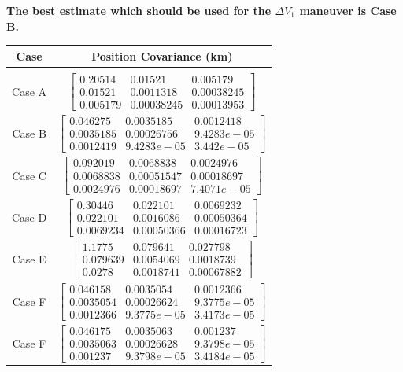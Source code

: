 \documentclass[conf]{new-aiaa}
\begin{document}
\textbf{The best estimate which should be used for the $\Delta V_1$ maneuver is Case B.}

\begin{table}[H]
	\centering
	\begin{tabular}{ c c }
		\toprule
		Case  & Position Covariance (km) \\
		\midrule \\
		\addlinespace[-2ex]
		Case A & $\begin{bmatrix}
	      	0.20514   &   0.01521    & 0.005179 \\
			0.01521   & 0.0011318  & 0.00038245 \\
			0.005179  & 0.00038245 &  0.00013953	
			 \end{bmatrix}$\\
		\addlinespace[1.5ex]
		Case B & $\begin{bmatrix}
			     0.046275   & 0.0035185  &  0.0012418 \\
			0.0035185  & 0.00026756  & 9.4283e-05 \\
			0.0012419  & 9.4283e-05  &  3.442e-05
		\end{bmatrix}$\\
		\addlinespace[1.5ex]
		Case C & $\begin{bmatrix}
			0.092019   & 0.0068838  &  0.0024976  \\
			0.0068838  & 0.00051547 &  0.00018697 \\
			0.0024976  & 0.00018697 &  7.4071e-05
		\end{bmatrix}$\\
		\addlinespace[1.5ex]
		Case D & $\begin{bmatrix}
			0.30446    & 0.022101   & 0.0069232  \\
			0.022101   & 0.0016086  & 0.00050364 \\
			0.0069234  & 0.00050366 &  0.00016723
		\end{bmatrix}$\\
		\addlinespace[1.5ex]
		Case E & $\begin{bmatrix}
      		1.1775    & 0.079641    & 0.027798   \\
			0.079639  &  0.0054069 &   0.0018739 \\
			0.0278   & 0.0018741  & 0.00067882
		\end{bmatrix}$\\
		\addlinespace[1.5ex]
		Case F & $\begin{bmatrix}
		    0.046158   & 0.0035054   & 0.0012366  \\
			0.0035054  & 0.00026624  & 9.3775e-05 \\
			0.0012366  & 9.3775e-05  & 3.4173e-05
		\end{bmatrix}$\\
		\addlinespace[1.5ex]
		Case F & $\begin{bmatrix}
	     	0.046175   & 0.0035063   &  0.001237  \\
			0.0035063  & 0.00026628  & 9.3798e-05 \\
			0.001237  & 9.3798e-05  & 3.4184e-05
		\end{bmatrix}$\\
		

\end{tabular}
\end{table}
\end{document}
